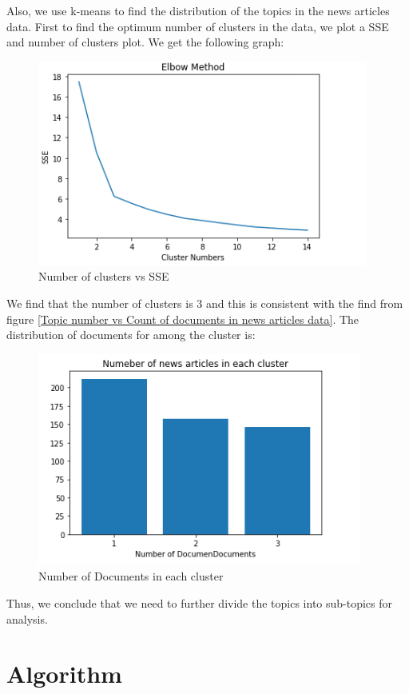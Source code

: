 \documentclass{article}
\begin{document}
Also, we use k-means to find the distribution of the topics in the news articles data. First to find the optimum number of clusters in the data, we plot a SSE and number of clusters plot. We get the following graph:
\begin{figure}[H]
    \centering
    \includegraphics{sse.PNG}
    \caption{Number of clusters vs SSE}
    \label{Number of clusters vs SSE}
\end{figure}

We find that the number of clusters is 3 and this is consistent with the find from figure \ref{Topic number vs Count of documents in news articles data}. The distribution of documents for among the cluster  is:
\begin{figure}[H]
    \centering
    \includegraphics{cluster.PNG}
    \caption{Number of Documents in each cluster}
    \label{Number of Documents in each cluster}
\end{figure}



Thus, we conclude that we need to further divide the topics into sub-topics for analysis.


\section{Algorithm}
\end{document}
